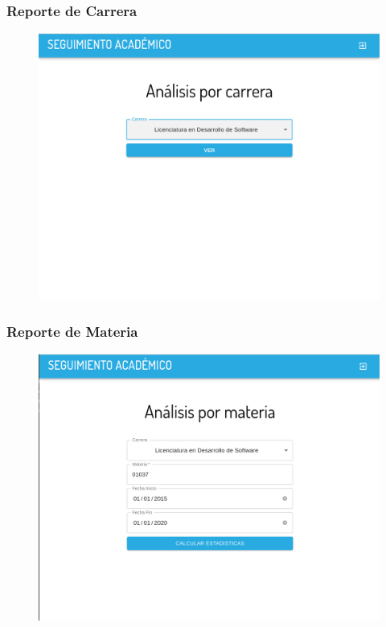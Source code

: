 \subsubsection{Reporte de Carrera}
\begin{figure}[!htbp]
  \centering
    \includegraphics[scale=0.3]{images/seguimiento-academico/sa-form-carrera.png}
  \label{fig:sa-carrera}
\end{figure}

\subsubsection{Reporte de Materia}
\begin{figure}[!htbp]
  \centering
    \includegraphics[scale=0.3]{images/seguimiento-academico/sa-form-materia.png}
  \label{fig:sa-materia}
\end{figure}

